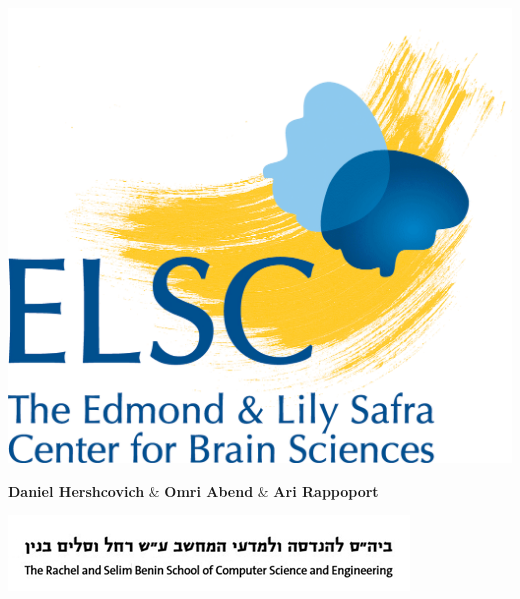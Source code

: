 \documentclass[extrafontsizes,60pt,twocolumn]{memoir}
\begin{document}
\begin{strip}
  \begin{center}
  \end{center}
  \vspace{-2.5in}
  \begin{center}
  \begin{minipage}[b]{.1\linewidth}
    \includegraphics[width=\linewidth]{elsc_logo.png}
    \vspace{-2in}
  \end{minipage}
  \hfill
  \begin{minipage}[b]{.75\linewidth}
    \centering
    \begin{minipage}{.7\linewidth}
      \HUGE\textbf{Daniel Hershcovich} \& \textbf{Omri Abend} \& \textbf{Ari Rappoport}
    \end{minipage}
    \begin{minipage}{.25\linewidth}
      \includegraphics[width=\linewidth]{cse_banner.jpg}
    \end{minipage}
    

\end{minipage}
\end{center}
\end{strip}
\end{document}
